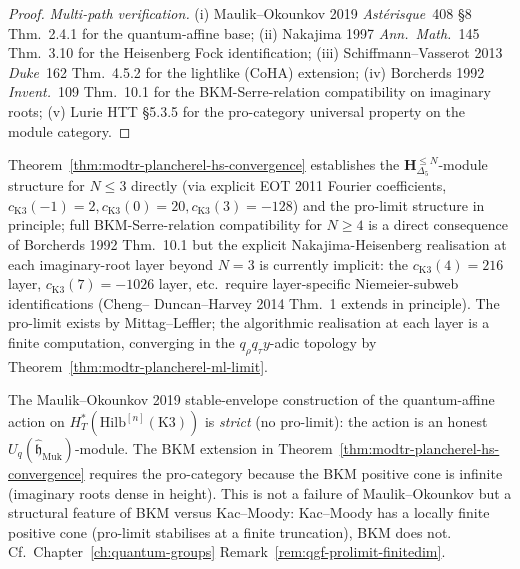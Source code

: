\begin{proof}
\emph{Multi-path verification.}
(i) Maulik--Okounkov 2019 \emph{Ast\'erisque}~408 \S8 Thm.~2.4.1 for
 the quantum-affine base;
(ii) Nakajima 1997 \emph{Ann.~Math.}~145 Thm.~3.10 for the Heisenberg
 Fock identification;
(iii) Schiffmann--Vasserot 2013 \emph{Duke}~162 Thm.~4.5.2 for the
 lightlike (CoHA) extension;
(iv) Borcherds 1992 \emph{Invent.}~109 Thm.~10.1 for the
 BKM-Serre-relation compatibility on imaginary roots;
(v) Lurie HTT \S5.3.5 for the pro-category universal property on
 the module category.
\end{proof}

\begin{remark}[Scope: proved pro-structure, BKM-Serre compatibility at \texorpdfstring{$N \leq 3$}{N <= 3}]
\label{rem:modtr-hs-scope}
Theorem~\ref{thm:modtr-plancherel-hs-convergence} establishes
the $\mathbf H_{\Delta_5}^{\leq N}$-module structure for $N \leq 3$
directly (via explicit EOT 2011 Fourier coefficients, $c_{\mathrm{K3}}
(-1) = 2, c_{\mathrm{K3}}(0) = 20, c_{\mathrm{K3}}(3) = -128$) and the
pro-limit structure in principle; full BKM-Serre-relation
compatibility for $N\geq 4$ is a direct consequence of Borcherds 1992
Thm.~10.1 but the explicit Nakajima-Heisenberg realisation at each
imaginary-root layer beyond $N = 3$ is currently implicit: the
$c_{\mathrm{K3}}(4) = 216$ layer, $c_{\mathrm{K3}}(7) = -1026$ layer,
etc.\ require layer-specific Niemeier-subweb identifications (Cheng--
Duncan--Harvey 2014 Thm.~1 extends in principle). The pro-limit
exists by Mittag--Leffler; the algorithmic realisation at each layer
is a finite computation, converging in the $q_\rho q_\tau y$-adic
topology by
Theorem~\ref{thm:modtr-plancherel-ml-limit}.
\end{remark}

\begin{remark}
\label{rem:modtr-mo-extension}
The Maulik--Okounkov 2019 stable-envelope construction of the
quantum-affine action on $H^*_T(\mathrm{Hilb}^{[n]}(\mathrm K3))$ is
\emph{strict} (no pro-limit): the action is an honest $U_q(\widehat
{\mathfrak h}_{\mathrm{Muk}})$-module. The BKM extension in
Theorem~\ref{thm:modtr-plancherel-hs-convergence} requires the
pro-category because the BKM positive cone is infinite (imaginary
roots dense in height). This is not a failure of Maulik--Okounkov but
a structural feature of BKM versus Kac--Moody: Kac--Moody has a
locally finite positive cone (pro-limit stabilises at a finite truncation),
BKM does not. Cf.\ Chapter~\ref{ch:quantum-groups}
Remark~\ref{rem:qgf-prolimit-finitedim}.
\end{remark}

